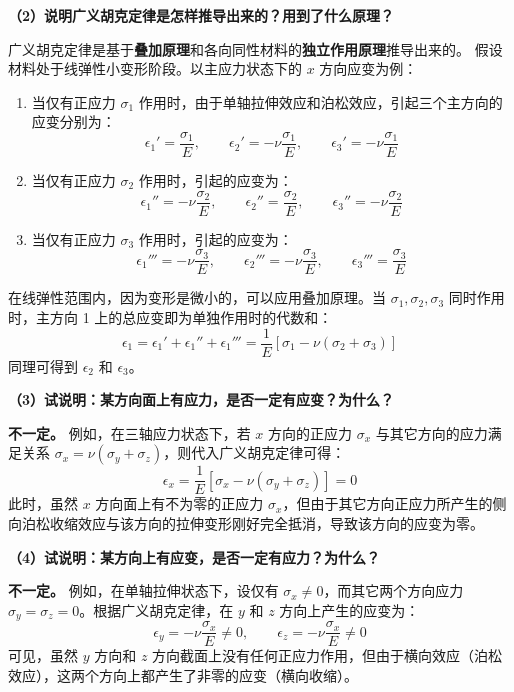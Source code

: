 \documentclass[11pt,a4paper]{ctexrep}
\begin{document}
{\textbf{（2）说明广义胡克定律是怎样推导出来的？用到了什么原理？}

广义胡克定律是基于\textbf{叠加原理}和各向同性材料的\textbf{独立作用原理}推导出来的。
假设材料处于线弹性小变形阶段。以主应力状态下的 $x$ 方向应变为例：
\begin{enumerate}
    \item 当仅有正应力 $\sigma_1$ 作用时，由于单轴拉伸效应和泊松效应，引起三个主方向的应变分别为：
          \[
              \epsilon_1' = \frac{\sigma_1}{E}, \qquad \epsilon_2' = -\nu \frac{\sigma_1}{E}, \qquad \epsilon_3' = -\nu \frac{\sigma_1}{E}
          \]
    \item 当仅有正应力 $\sigma_2$ 作用时，引起的应变为：
          \[
              \epsilon_1'' = -\nu \frac{\sigma_2}{E}, \qquad \epsilon_2'' = \frac{\sigma_2}{E}, \qquad \epsilon_3'' = -\nu \frac{\sigma_2}{E}
          \]
    \item 当仅有正应力 $\sigma_3$ 作用时，引起的应变为：
          \[
              \epsilon_1''' = -\nu \frac{\sigma_3}{E}, \qquad \epsilon_2''' = -\nu \frac{\sigma_3}{E}, \qquad \epsilon_3''' = \frac{\sigma_3}{E}
          \]
\end{enumerate}
在线弹性范围内，因为变形是微小的，可以应用叠加原理。当 $\sigma_1, \sigma_2, \sigma_3$ 同时作用时，主方向 1 上的总应变即为单独作用时的代数和：
\[
    \epsilon_1 = \epsilon_1' + \epsilon_1'' + \epsilon_1''' = \frac{1}{E} \left[ \sigma_1 - \nu (\sigma_2 + \sigma_3) \right]
\]
同理可得到 $\epsilon_2$ 和 $\epsilon_3$。

\textbf{（3）试说明：某方向面上有应力，是否一定有应变？为什么？}

\textbf{不一定。}
例如，在三轴应力状态下，若 $x$ 方向的正应力 $\sigma_x$ 与其它方向的应力满足关系 $\sigma_x = \nu (\sigma_y + \sigma_z)$，则代入广义胡克定律可得：
\[
    \epsilon_x = \frac{1}{E} \left[ \sigma_x - \nu (\sigma_y + \sigma_z) \right] = 0
\]
此时，虽然 $x$ 方向面上有不为零的正应力 $\sigma_x$，但由于其它方向正应力所产生的侧向泊松收缩效应与该方向的拉伸变形刚好完全抵消，导致该方向的应变为零。

\textbf{（4）试说明：某方向上有应变，是否一定有应力？为什么？}

\textbf{不一定。}
例如，在单轴拉伸状态下，设仅有 $\sigma_x \ne 0$，而其它两个方向应力 $\sigma_y = \sigma_z = 0$。根据广义胡克定律，在 $y$ 和 $z$ 方向上产生的应变为：
\[
    \epsilon_y = -\nu \frac{\sigma_x}{E} \ne 0, \qquad \epsilon_z = -\nu \frac{\sigma_x}{E} \ne 0
\]
可见，虽然 $y$ 方向和 $z$ 方向截面上没有任何正应力作用，但由于横向效应（泊松效应），这两个方向上都产生了非零的应变（横向收缩）。

}
\end{document}

